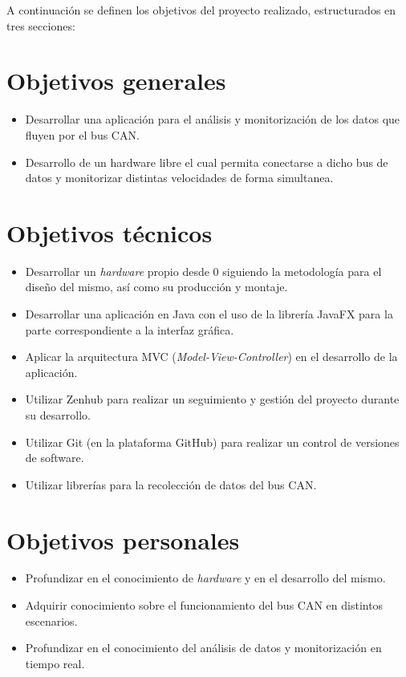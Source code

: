 
A continuación se definen los objetivos del proyecto realizado, estructurados en tres secciones:


\section{Objetivos generales}\label{objetivos-generales}

\begin{itemize}

\item
  Desarrollar una aplicación para el análisis y monitorización de  los datos que fluyen por el bus CAN.
\item
  Desarrollo de un hardware libre el cual permita conectarse a dicho bus de datos y monitorizar distintas velocidades de forma simultanea.

  
\end{itemize}

\section{Objetivos técnicos}\label{objetivos-tecnicos}

\begin{itemize}

\item
  Desarrollar un \emph{hardware} propio desde 0 siguiendo la metodología para el diseño del mismo, así como su producción y montaje.
\item
  Desarrollar una aplicación en Java con el uso de la librería JavaFX para la parte correspondiente a la interfaz gráfica.
\item
  Aplicar la arquitectura MVC (\emph{Model-View-Controller}) en el desarrollo de la aplicación.
\item
  Utilizar Zenhub para realizar un seguimiento y gestión del proyecto durante su desarrollo.
\item
  Utilizar Git (en la plataforma GitHub) para realizar un control de versiones de software.
\item
  Utilizar librerías para la recolección de datos del bus CAN.
\end{itemize}

\section{Objetivos personales}\label{objetivos-personales}

\begin{itemize}

\item
  Profundizar en el conocimiento de \emph{hardware} y en el desarrollo del mismo.
\item
  Adquirir conocimiento sobre el funcionamiento del bus CAN en distintos escenarios.
\item
  Profundizar en el conocimiento del análisis de datos y monitorización en tiempo real.

\end{itemize}